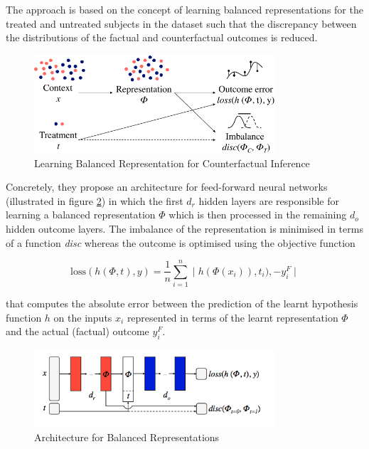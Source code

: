 The approach is based on the concept of learning balanced representations for the treated and untreated subjects in the dataset such that the discrepancy between the distributions of the factual and counterfactual outcomes is reduced. 

\begin{figure}[h]
	\centering
	\includegraphics[width=0.8\textwidth]{figures/chapter-2/balanced-representations.png}
	\caption{Learning Balanced Representation for Counterfactual Inference}\label{fig:balanced-representations}
\end{figure}

Concretely, they propose an architecture for feed-forward neural networks (illustrated in figure \ref{fig:balanced-representations-architecture}) in which the first $d_r$ hidden layers are responsible for learning a balanced representation $\Phi$ which is then processed in the remaining $d_o$ hidden outcome layers. 
The imbalance of the representation is minimised in terms of a function \emph{disc} whereas the outcome is optimised using the objective function 

\begin{equation}
	\text{loss}(h(\Phi, t), y) = \frac{1}{n}\sum_{i=1}^{n} \mid h(\Phi(x_i)), t_i), - y_i^{F} \mid
\end{equation}

that computes the absolute error between the prediction of the learnt hypothesis function $h$ on the inputs $x_i$ represented in terms of the learnt representation $\Phi$ and the actual (factual) outcome $y_i^F$. 

\begin{figure}[h]
	\centering
	\includegraphics[width=0.8\textwidth]{figures/chapter-2/sontag-architecture.png}
	\caption{Architecture for Balanced Representations}\label{fig:balanced-representations-architecture}
\end{figure}

